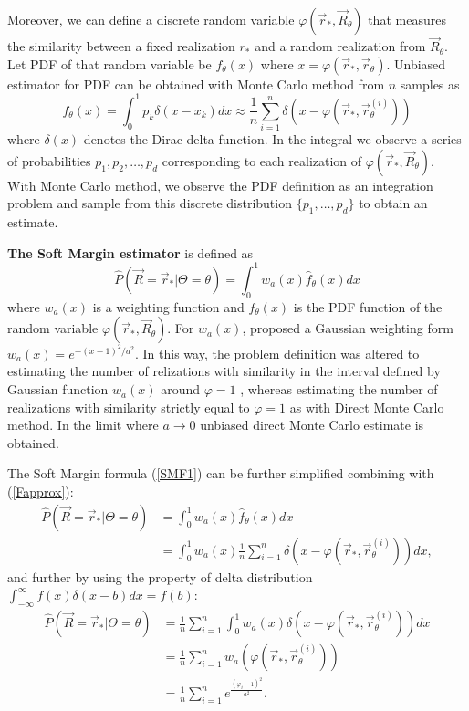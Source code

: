 \documentclass[times, utf8, diplomski]{fer}
\begin{document}
Moreover, we  can define a discrete random variable $\varphi(\vec r_*, \vec R_{\theta})$ that measures the similarity between a fixed realization $r_*$ and a random realization from $\vec R_{\theta}$. Let PDF of that random variable be $f_\theta(x)$ where $x = \varphi(\vec r_*, \vec r_{\theta})$. Unbiased estimator for PDF can be obtained with Monte Carlo method from $n$  samples as 
\begin{equation}
f_{\theta}(x) = \int_0^1 p_k \delta(x - x_k)dx \approx \frac{1}{n} \sum_{i = 1}^{n} \delta(x - \varphi(\vec r_*, \vec r_{\theta} ^{(i)}))
\label{Fapprox}
\end{equation}
where $\delta(x)$ denotes the Dirac delta function. In the integral we observe a series of probabilities $p_1, p_2, \ldots, p_d$ corresponding to each realization of $\varphi(\vec r_*, \vec R_{\theta})$. With Monte Carlo method, we observe the PDF definition as an integration problem and sample from this discrete distribution $\{p_1, \ldots, p_d\}$ to obtain an estimate.

\textbf{The Soft Margin estimator} is defined as 
\begin{equation}
\hat{P}(\vec R = \vec r_* | \Theta = \theta) = \int_0^1 w_a(x)\hat{f}_\theta(x)dx
\label{SMF1}
\end{equation}
where $w_a(x)$ is a weighting function and $f_\theta(x)$ is the PDF function of the random variable $\varphi(\vec r_*, \vec R_\theta)$. For $w_a(x)$, \cite{Nino} proposed a Gaussian weighting form $w_a(x) = e^{-(x -1)^2 / a ^2}$. In this way, the problem definition was altered to estimating the number of relizations with similarity in the interval defined by Gaussian function $w_a(x)$ around $\varphi = 1$ , whereas estimating the number of realizations with similarity strictly equal to $\varphi = 1$ as with Direct Monte Carlo method. In the limit where $a \rightarrow 0$ unbiased direct Monte Carlo estimate is obtained.

The Soft Margin formula (\ref{SMF1}) can be further simplified combining with (\ref{Fapprox}):
\begin{equation}
\begin{aligned}
\hat{P}(\vec R = \vec r_* | \Theta = \theta) &= \int_0^1 w_a(x)\hat{f}_\theta(x)dx \\ &=
\int_0^1 w_a(x) \frac{1}{n} \sum_{i = 1}^{n}\delta(x - \varphi(\vec r_*, \vec r_{\theta}^{(i)})) dx,
\end{aligned}
\end{equation}
and further by using the property of delta distribution $\int_{-\infty}^{\infty} f(x)\delta(x - b)dx = f(b)$:
\begin{equation}
\begin{aligned}
\hat{P}(\vec R = \vec r_* | \Theta = \theta) &= \frac{1}{n} \sum_{i = 1}^{n} \int_0^1 w_a(x) \delta(x - \varphi(\vec r_*, \vec r_{\theta}^{(i)})) dx  \\ &= \frac{1}{n} \sum_{i = 1}^{n}  w_a(\varphi(\vec  r_*, \vec r_\theta^{(i)})) \\ &= \frac{1}{n} \sum_{i = 1}^{n} e ^{\frac{(\varphi_i -1)^2}{a ^2}}.
\end{aligned}
\end{equation}
\end{document}

